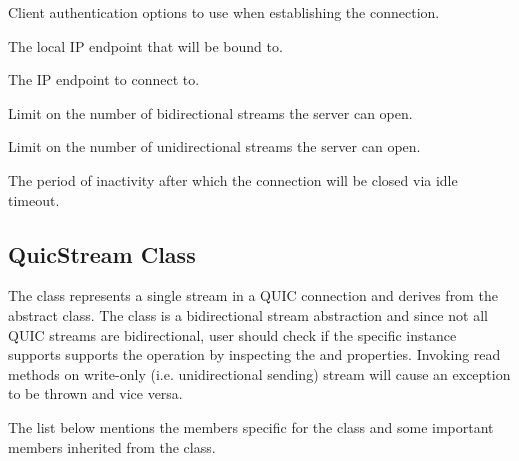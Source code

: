 \begin{description}

     Client authentication options to use when establishing the connection.

     The local IP endpoint that will be bound to.

     The IP endpoint to connect to.

     Limit on the number of bidirectional streams the server can open.

     Limit on the number of unidirectional streams the server can open.

     The period of inactivity after which the connection will be closed via idle timeout.

\end{description}

\subsection{QuicStream Class}

The \QuicStream{} class represents a single stream in a QUIC connection and derives from the
abstract  class. The  class is a bidirectional stream abstraction and
since not all QUIC streams are bidirectional, user should check if the specific \QuicStream{}
instance supports supports the operation by inspecting the  and 
properties. Invoking read methods on write-only (i.e. unidirectional sending) stream will cause an
exception to be thrown and vice versa.

The list below mentions the members specific for the  class and some important
members inherited from the  class.


